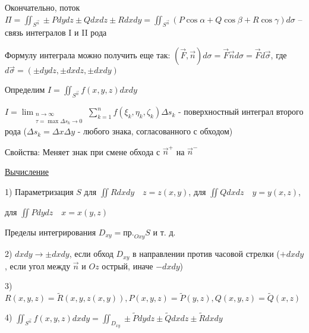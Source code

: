 \documentclass[12pt]{article}
\begin{document}
\begin{enumerate}[label*=\textbf{\arabic** }]
    \hypertarget{connectionbetweensurfaceintegral}{}

    Окончательно, поток $\Pi = \iint_{S^{\vec{n}}} \pm Pdydz \pm Qdxdz \pm Rdxdy = \iint_{S^{\vec{n}}} (P\cos\alpha + Q\cos\beta + R\cos\gamma) d\sigma$ -- связь интегралов I и II рода

    \Nota Формулу интеграла можно получить еще так: $(\vec{F}, \vec{n})d\sigma = \vec{F}\vec{n}d\sigma = \vec{F}d\vec{\sigma}$, где $d\vec{\sigma} = (\pm dydz, \pm dxdz, \pm dxdy)$

    \hypertarget{surfaceintegralofsecondkindmath}{}


    Определим $I = \iint_{S^{\overrightarrow{n}}} f(x, y, z) dxdy$

    $I = \lim_{\substack{n \to \infty \\ \tau = \max \Delta s_k \to 0}} \sum_{k=1}^n f(\xi_k, \eta_k, \zeta_k) \Delta s_k$ - поверхностный интеграл второго рода
    ($\Delta s_k = \Delta x\Delta y$ - любого знака, согласованного с обходом)

    \hypertarget{surfaceintegralofsecondkindproperties}{}

    Свойства: Меняет знак при смене обхода с $\overrightarrow{n}^+$ на $\overrightarrow{n}^-$

    \hypertarget{surfaceintegralofsecondkindcalculation}{}

    \underline{Вычисление}

    1) Параметризация $S$ \quad для $\iint Rdxdy \quad z = z(x, y)$, для $\iint Qdxdz \quad y = y(x, z)$,

    для $\iint Pdydz \quad x = x(y, z)$

    Пределы интегрирования $D_{xy} = \text{пр.}_{Oxy} S$ и т. д.

    2) $dxdy \to \pm dxdy$, если обход $D_{xy}$ в направлении против часовой стрелки ($+dxdy$, если угол между $\overrightarrow{n}$ и $Oz$ острый, иначе $-dxdy$)

    3) $R(x, y, z) = \tilde{R}(x, y, z(x, y)), P(x, y, z) = \tilde{P}(y, z), Q(x, y, z) = \tilde{Q}(x, z)$

    4) $\iint_{S^{\overrightarrow{n}}} f(x, y, z) dxdy = \iint_{D_{xy}} \pm \tilde{P}dydz \pm \tilde{Q}dxdz \pm \tilde{R}dxdy$
    \end{enumerate}
\end{document}
